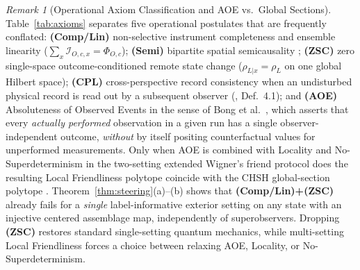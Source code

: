 \documentclass[11pt,a4paper]{article}
\theoremstyle{definition}
\theoremstyle{remark}
\newtheorem{remark}{Remark}
\newcommand{\cI}{\mathcal{I}}
\newcommand{\1}{\mathbf{1}}
\begin{document}
\begin{remark}[Operational Axiom Classification and AOE vs.\ Global Sections]\label{rem:axiom-table}
Table~\ref{tab:axioms} separates five operational postulates that are frequently conflated:
\textbf{(Comp/Lin)} non-selective instrument completeness and ensemble linearity ($\sum_x\cI_{O,c,x}=\Phi_{O,c}$);
\textbf{(Semi)} bipartite spatial semicausality \cite{Beckman2001};
\textbf{(ZSC)} zero single-space outcome-conditioned remote state change ($\rho_{L|x}=\rho_L$ on one global Hilbert space);
\textbf{(CPL)} cross-perspective record consistency when an undisturbed physical record is read out by a subsequent observer (\cite{AdlamRovelli2022}, Def.~4.1); and
\textbf{(AOE)} Absoluteness of Observed Events in the sense of Bong et al.\ \cite{Bong2020}, which asserts that every \emph{actually performed} observation in a given run has a single observer-independent outcome, \emph{without} by itself positing counterfactual values for unperformed measurements. Only when AOE is combined with Locality and No-Superdeterminism in the two-setting extended Wigner's friend protocol does the resulting Local Friendliness polytope coincide with the CHSH global-section polytope \cite{Bong2020}.
Theorem~\ref{thm:steering}(a)--(b) shows that \textbf{(Comp/Lin)+(ZSC)} already fails for a \emph{single} label-informative exterior setting on any state with an injective centered assemblage map, independently of superobservers. Dropping \textbf{(ZSC)} restores standard single-setting quantum mechanics, while multi-setting Local Friendliness \cite{Bong2020,FrauchigerRenner2018,OrmrodVilasiniBarrett2023,HausmannRenner2025,Walleghem2025} forces a choice between relaxing AOE, Locality, or No-Superdeterminism.
\end{remark}
\end{document}
